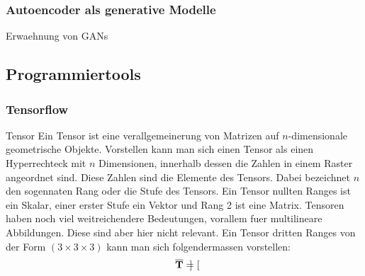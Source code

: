 \documentclass[../main]{subfiles}
\begin{document}
\subsubsection{Autoencoder als generative Modelle}
Erwaehnung von GANs

\subsection{Programmiertools}

\subsubsection{Tensorflow}
\begin{defbox}{Tensor}
  Ein Tensor ist eine verallgemeinerung von Matrizen auf
  $n$-dimensionale geometrische Objekte. Vorstellen kann man sich einen Tensor
  als einen Hyperrechteck mit $n$ Dimensionen, innerhalb dessen die Zahlen in
  einem Raster angeordnet sind. Diese Zahlen sind die Elemente des Tensors.
  Dabei bezeichnet $n$ den sogennaten Rang oder die Stufe des Tensors.
  Ein Tensor nullten Ranges ist ein Skalar, einer erster Stufe ein Vektor und
  Rang 2 ist eine Matrix.
  Tensoren haben noch viel weitreichendere Bedeutungen, vorallem fuer
  multilineare Abbildungen. Diese sind aber hier nicht relevant.
  \para{}
  Ein Tensor dritten Ranges von der Form $(3 \times 3 \times 3)$ kann man sich
  folgendermassen vorstellen:
  \begin{equation*}
    \overline{\mathbf{T}} = \begin{bmatrix}

    \end{bmatrix}
  \end{equation*}

\end{defbox}
\end{document}
